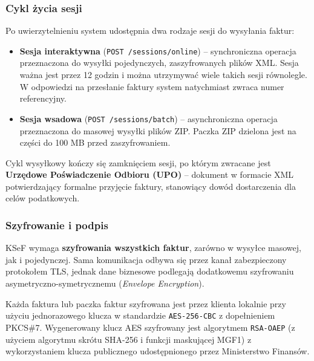 \subsubsection{Cykl życia sesji}
\label{sec:ksef-cykl-zycia-sesji}

Po uwierzytelnieniu system udostępnia dwa rodzaje sesji do wysyłania faktur:

\begin{itemize}
    \item \textbf{Sesja interaktywna} (\texttt{POST /sessions/online}) -- synchroniczna operacja przeznaczona do wysyłki pojedynczych, zaszyfrowanych plików XML. Sesja ważna jest przez 12 godzin i można utrzymywać wiele takich sesji równolegle. W odpowiedzi na przesłanie faktury system natychmiast zwraca numer referencyjny. \cite{ksef-sesja-interaktywna}
    \item \textbf{Sesja wsadowa} (\texttt{POST /sessions/batch}) -- asynchroniczna operacja przeznaczona do masowej wysyłki plików ZIP. Paczka ZIP dzielona jest na części do 100 MB przed zaszyfrowaniem. \cite{ksef-sesja-wsadowa}
\end{itemize}

Cykl wysyłkowy kończy się zamknięciem sesji, po którym zwracane jest \textbf{Urzędowe Poświadczenie Odbioru (UPO)} -- dokument w formacie XML potwierdzający formalne przyjęcie faktury, stanowiący dowód dostarczenia dla celów podatkowych. \cite{ksef-sesja-sprawdzenie-stanu-i-pobranie-upo}

\subsubsection{Szyfrowanie i podpis}
\label{sec:ksef-szyfrowanie-i-podpis}

KSeF wymaga \textbf{szyfrowania wszystkich faktur}, zarówno w wysyłce masowej, jak i pojedynczej. Sama komunikacja odbywa się przez kanał zabezpieczony protokołem TLS, jednak dane biznesowe podlegają dodatkowemu szyfrowaniu asymetryczno-symetrycznemu (\textit{Envelope Encryption}). 

Każda faktura lub paczka faktur szyfrowana jest przez klienta lokalnie przy użyciu jednorazowego klucza w standardzie \texttt{AES-256-CBC} z dopełnieniem PKCS\#7. Wygenerowany klucz AES szyfrowany jest algorytmem \texttt{RSA-OAEP} (z użyciem algorytmu skrótu SHA-256 i funkcji maskującej MGF1) z wykorzystaniem klucza publicznego udostępnionego przez Ministerstwo Finansów. \cite{ksef-docs-przeglad,ksef-weryfikacja-faktury}

